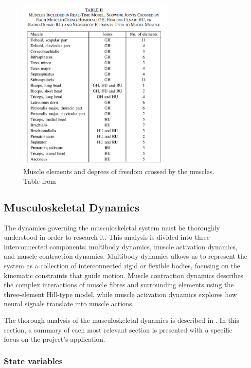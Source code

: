 \begin{figure}[ht!]
    \centering
    \includegraphics[width=0.7\textwidth]{Pictures/DAS/muscles_elements.png}
    \caption{Muscle elements and degrees of freedom crossed by the muscles. Table from \cite{RT3D}}
    \label{fig:muscle_elements}
\end{figure}

\newpage
\subsection{Musculoskeletal Dynamics}

The dynamics governing the musculoskeletal system must be thoroughly understood in order to research it. This analysis is divided into three interconnected components: multibody dynamics, muscle activation dynamics, and muscle contraction dynamics. Multibody dynamics allows us to represent the system as a collection of interconnected rigid or flexible bodies, focusing on the kinematic constraints that guide motion. Muscle contraction dynamics describes the complex interactions of muscle fibres and surrounding elements using the three-element Hill-type model, while muscle activation dynamics explores how neural signals translate into muscle actions.

The thorough analysis of the musculoskeletal dynamics is described in \cite{IMP}. In this section, a summary of each most relevant section is presented with a specific focus on the project's application.\newline


\subsubsection{State variables}\label{state}

